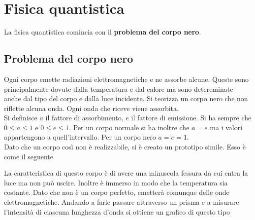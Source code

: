 
\section{Fisica quantistica}
La fisica quantistica comincia con il \textbf{problema del corpo nero}.

\subsection{Problema del corpo nero}
Ogni corpo emette radiazioni elettromagnetiche e ne assorbe alcune. Queste sono principalmente dovute
dalla temperatura e dal calore ma sono detereminate anche dal tipo del corpo e dalla luce incidente.
Si teorizza un corpo nero che non riflette alcuna onda. Ogni onda che riceve viene assorbita.\\
Si definisce $a$ il fattore di assorbimento, $e$ il fattore di emissione. Si ha sempre che
$0\leq a\leq1$ e $0\leq e\leq1$. Per un corpo normale si ha inoltre che $a=e$ ma i valori 
appartengono a quell'intervallo. Per un corpo nero $a=e=1$.\\
Dato che un corpo così non è realizzabile, si è creato un prototipo simile. Esso è come il seguente
\begin{center}
\end{center}
La caratteristica di questo corpo è di avere una minuscola fessura da cui entra la luce ma non può
uscire. Inoltre è immerso in modo che la temperatura sia costante. Dato che non è un corpo perfetto,
emetterà comunque delle onde elettromagnetiche. Andando a farle passare attraverso un prisma e a
misurare l'intensità di ciascuna lunghezza d'onda si ottiene un grafico di questo tipo
\begin{center}
\end{center}
